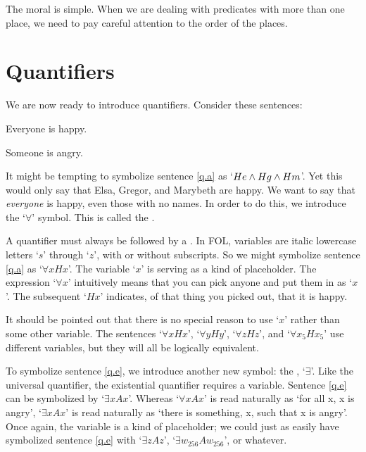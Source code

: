 The moral is simple. When we are dealing with predicates with more than one place, we need to pay careful attention to the order of the places.


\section{Quantifiers}
We are now ready to introduce quantifiers. Consider these sentences:
	\begin{earg}
		\item[\ex{q.a}] Everyone is happy.
		\item[\ex{q.e}] Someone is angry.
	\end{earg}
It might be tempting to symbolize sentence \ref{q.a} as `$He \wedge Hg \wedge Hm$'. Yet this would only say that Elsa, Gregor, and Marybeth are happy. We want to say that \emph{everyone} is happy, even those with no names. In order to do this, we introduce the `$\forall$' symbol. This is called the .


A quantifier must always be followed by a . In FOL, variables are italic lowercase letters `$s$' through `$z$', with or without subscripts. So we might symbolize sentence \ref{q.a} as `$\forall x Hx$'.  The variable `$x$' is serving as a kind of placeholder. The expression `$\forall x$' intuitively means that you can pick anyone and put them in as `$x$'. The subsequent `$Hx$' indicates, of that thing you picked out, that it is happy. 



It should be pointed out that there is no special reason to use `$x$' rather than some other variable. The sentences `$\forall x Hx$', `$\forall y Hy$', `$\forall z Hz$', and `$\forall x_5 Hx_5$' use different variables, but they will all be logically equivalent.

To symbolize sentence \ref{q.e}, we introduce another new symbol: the , `$\exists$'. Like the universal quantifier, the existential quantifier requires a variable. Sentence \ref{q.e} can be symbolized by `$\exists x Ax$'. Whereas `$\forall x Ax$' is read naturally as `for all x, x is angry', `$\exists x Ax$' is read naturally as `there is something, x, such that x is angry'. Once again, the variable is a kind of placeholder; we could just as easily have symbolized sentence \ref{q.e} with `$\exists z Az$', `$\exists w_{256} Aw_{256}$', or whatever.

